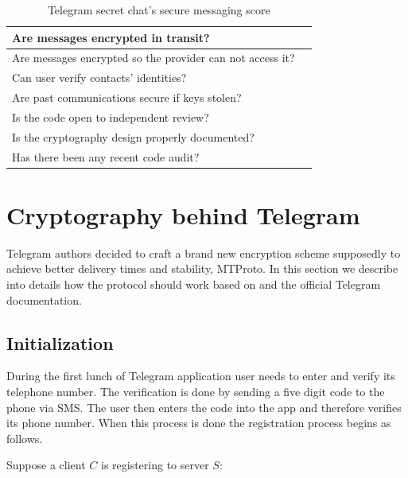 \documentclass[thesis=M,english]{FITthesis}[2012/10/20]
\newcommand{\cmark}{\ding{51}}%
\begin{document}
\begin{table}[htb]
	\centering
	\caption{Telegram secret chat's secure messaging score}
	\label{tab:telegram-secret-eff}
	\begin{tabular}{|l|l|}
		\hline
		Are messages encrypted in transit? & \cmark \\\hline
		Are messages encrypted so the provider can not access it? & \cmark \\ \hline
		Can user verify contacts' identities? & \cmark \\ \hline
		Are past communications secure if keys stolen? & \cmark \\ \hline
		Is the code open to independent review? & \cmark \\ \hline
		Is the cryptography design properly documented? & \cmark \\ \hline
		Has there been any recent code audit? & \cmark \\ \hline
	\end{tabular}
\end{table}







\chapter{Cryptography behind Telegram}\label{telegramcrypto}

Telegram authors decided to craft a brand new encryption scheme supposedly to achieve better delivery times and stability, MTProto. In this section we describe into details how the protocol should work based on \cite{telegram-aarhus} and the official Telegram documentation.


\section{Initialization}\label{crypto-initialization}

During the first lunch of Telegram application user needs to enter and verify its telephone number. The verification is done by sending a five digit code to the phone via SMS. The user then enters the code into the app and therefore verifies its phone number. When this process is done the registration process begins as follows.

Suppose a client $C$ is registering to server $S$:
\end{document}
